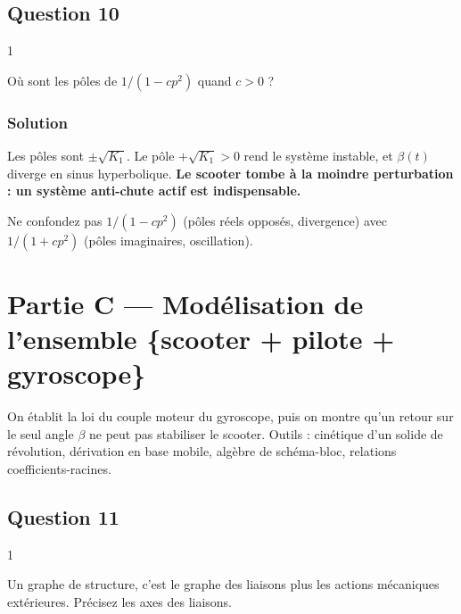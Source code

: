 \documentclass[11pt,a4paper]{article}
\begin{document}
\hypertarget{question-10}{%
\subsection{Question 10}\label{question-10}}

\begin{indication}{1}

Où sont les pôles de \(1/(1-cp^2)\) quand \(c>0\) ?

\end{indication}

\hypertarget{solution-9}{%
\subsubsection{Solution}\label{solution-9}}

Les pôles sont \(\pm\sqrt{K_1}\). Le pôle \(+\sqrt{K_1}>0\) rend le système instable, et \(\beta(t)\) diverge en sinus hyperbolique. \textbf{Le scooter tombe à la moindre perturbation : un système anti-chute actif est indispensable.}

\begin{piege}

Ne confondez pas \(1/(1-cp^2)\) (pôles réels opposés, divergence) avec \(1/(1+cp^2)\) (pôles imaginaires, oscillation).

\end{piege}

\hypertarget{partie-c-moduxe9lisation-de-lensemble-scooter-pilote-gyroscope}{%
\section{Partie C --- Modélisation de l'ensemble \{scooter + pilote + gyroscope\}}\label{partie-c-moduxe9lisation-de-lensemble-scooter-pilote-gyroscope}}

On établit la loi du couple moteur du gyroscope, puis on montre qu'un retour sur le seul angle \(\beta\) ne peut pas stabiliser le scooter. Outils : cinétique d'un solide de révolution, dérivation en base mobile, algèbre de schéma-bloc, relations coefficients-racines.

\hypertarget{question-11}{%
\subsection{Question 11}\label{question-11}}

\begin{indication}{1}

Un graphe de structure, c'est le graphe des liaisons plus les actions mécaniques extérieures. Précisez les axes des liaisons.

\end{indication}
\end{document}
